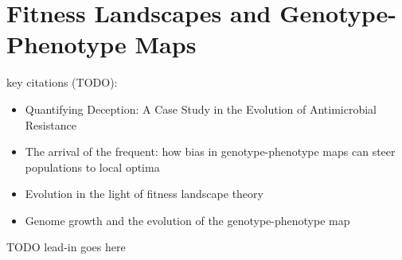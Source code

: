 \section{Fitness Landscapes and Genotype-Phenotype Maps}
\label{sec:fitness-landscape}

key citations (TODO):
\begin{itemize}
  \item Quantifying Deception: A Case Study in the Evolution of Antimicrobial Resistance \citep{eppstein2016quantifying}
  \item The arrival of the frequent: how bias in genotype-phenotype maps can steer populations to local optima \citep{schaper2014arrival}
  \item Evolution in the light of fitness landscape theory \citep{fragata2019evolution}
  \item Genome growth and the evolution of the genotype-phenotype map \citep{altenberg1995genome}
\end{itemize}

TODO lead-in goes here


